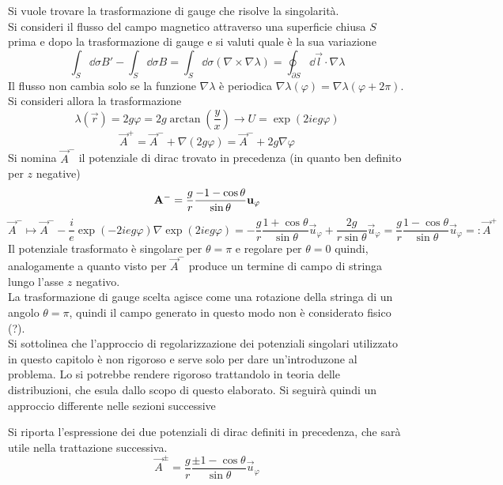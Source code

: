 Si vuole trovare la trasformazione di gauge che risolve la singolarità.\\

Si consideri il flusso del campo magnetico attraverso una superficie chiusa $S$
prima e dopo la trasformazione di gauge e si valuti quale è la sua variazione
$$
   \int_S \dd\sigma B' - \int_S \dd\sigma B = \int_S \dd\sigma (\nabla \times \nabla \lambda)
      = \oint_{\partial S} \dd\vec l \cdot \nabla \lambda
$$
Il flusso non cambia solo se la funzione $\nabla \lambda$ è periodica $\nabla
\lambda(\varphi) = \nabla \lambda( \varphi + 2\pi)$. Si consideri allora la trasformazione
$$
\lambda(\vec r) = 2g\varphi = 2g\arctan\left(\frac{y}{x}\right) \to U = \exp(2ieg\varphi)
$$
\begin{equation}\label{eq:gaugetrasf}
   \vec A ^+ = \vec A ^- + \nabla(2g \varphi) = \vec A ^- + 2g\nabla\varphi
\end{equation}
Si nomina $\vec A^-$ il potenziale di dirac trovato in precedenza (in quanto ben
definito per $z$ negative)
$$
   \vec A^- = \frac{g}{r}\frac{-1 - \cos\theta}{\sin\theta} \vec u _\varphi  \\
$$
$$
  \vec A ^- \mapsto \vec A ^- - \frac{i}{e} \exp( -2ieg\varphi )\nabla \exp(2ieg\varphi ) =
     -\frac{g}{r}\frac{1+\cos\theta}{\sin\theta}\vec u _\varphi
     + \frac{2g}{r\sin\theta}\vec u _\varphi
     = \frac{g}{r}\frac{1 - \cos\theta}{\sin\theta} \vec u _\varphi
     =: \vec A ^+
$$
Il potenziale trasformato è singolare per $\theta = \pi$ e regolare per
$\theta =  0$ quindi, analogamente a quanto visto per $\vec A^-$ produce un termine
di campo di stringa lungo l'asse $z$ negativo.\\
La trasformazione di gauge scelta agisce come una rotazione della stringa
di un angolo $\theta = \pi$, quindi il campo generato in questo modo non è
considerato fisico (?).\\

Si sottolinea che l'approccio di regolarizzazione dei potenziali singolari
utilizzato in questo capitolo è non rigoroso e serve solo per dare un'introduzone
al problema. Lo si potrebbe rendere rigoroso trattandolo in teoria delle
distribuzioni, che esula dallo scopo di questo elaborato. Si seguirà quindi
un approccio differente nelle sezioni successive

Si riporta l'espressione dei due potenziali di dirac definiti in precedenza, che
sarà utile nella trattazione successiva.
\begin{equation}\label{eq:localdiracpotential}
  \vec A^\pm = \frac{g}{r}\frac{\pm 1 - \cos\theta}{\sin\theta} \vec u _\varphi
\end{equation}

